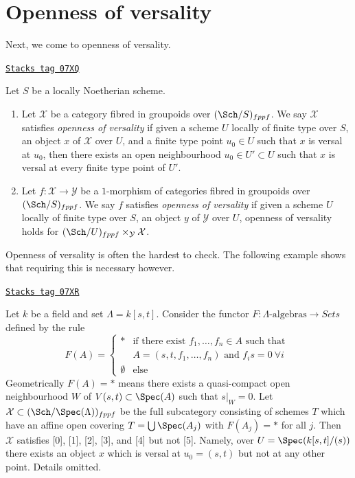 \section{Openness of versality}
\label{artin-section-openness-versality}
Next, we come to openness of versality.

\begin{definition}
\label{artin-definition-openness-versality}
\href{https://stacks.math.columbia.edu/tag/07XQ}{\texttt{Stacks tag 07XQ}}

Let $S$ be a locally Noetherian scheme.
\begin{enumerate}
\item Let $\mathcal{X}$ be a category
fibred in groupoids over $(\Sch/S)_{fppf}$. We say $\mathcal{X}$ satisfies
{\it openness of versality} if given a scheme $U$ locally of finite type
over $S$, an object $x$ of $\mathcal{X}$ over $U$, and a finite type point
$u_0 \in U$ such that $x$ is versal at $u_0$, then there exists an open
neighbourhood $u_0 \in U' \subset U$ such that $x$ is versal at every finite
type point of $U'$.
\item Let $f : \mathcal{X} \to \mathcal{Y}$ be a $1$-morphism of categories
fibred in groupoids over $(\Sch/S)_{fppf}$. We say $f$ satisfies
{\it openness of versality} if given a scheme $U$ locally of finite type
over $S$, an object $y$ of $\mathcal{Y}$ over $U$, openness
of versality holds for
$(\Sch/U)_{fppf} \times_\mathcal{Y} \mathcal{X}$.
\end{enumerate}
\end{definition}

Openness of versality is often the hardest to check. The following example
shows that requiring this is necessary however.

\begin{example}[Versality]
\label{artin-example-versality}
\href{https://stacks.math.columbia.edu/tag/07XR}{\texttt{Stacks tag 07XR}}

Let $k$ be a field and set $\Lambda = k[s, t]$. Consider the functor
$F : \Lambda\text{-algebras} \longrightarrow \textit{Sets}$
defined by the rule
$$
F(A) =
\left\{
\begin{matrix}
* & \text{if there exist }f_1, \ldots, f_n \in A\text{ such that } \\
  & A = (s, t, f_1, \ldots, f_n)\text{ and } f_i s = 0\ \forall i \\
\emptyset & \text{else}
\end{matrix}
\right.
$$
Geometrically $F(A) = *$ means there exists a quasi-compact open neighbourhood
$W$ of $V(s, t) \subset \Spec(A)$ such that $s|_W = 0$.
Let $\mathcal{X} \subset (\Sch/\Spec(\Lambda))_{fppf}$ be the full
subcategory consisting of schemes $T$ which have an affine open covering
$T = \bigcup \Spec(A_j)$ with $F(A_j) = *$ for all $j$. Then $\mathcal{X}$
satisfies [0], [1], [2], [3], and [4] but not [5]. Namely, over
$U = \Spec(k[s, t]/(s))$
there exists an object $x$ which is versal at $u_0 = (s, t)$ but not
at any other point. Details omitted.
\end{example}

